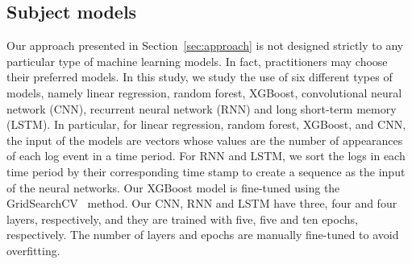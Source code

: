 \subsection{Subject models}
Our approach presented in Section~\ref{sec:approach} is not designed strictly to any particular type of machine learning models. In fact, practitioners may choose their preferred models. In this study, we study the use of six different types of models, namely linear regression, random forest, XGBoost, convolutional neural network (CNN), recurrent neural network (RNN) and long short-term memory (LSTM). In particular, for linear regression, random forest, XGBoost, and CNN, the input of the models are vectors whose values are the number of appearances of each log event in a time period. For RNN and LSTM, we sort the logs in each time period by their corresponding time stamp to create a sequence as the input of the neural networks. Our XGBoost model is fine-tuned using the GridSearchCV~\citep{girdsearcv} method. Our CNN, RNN and LSTM have three, four and four layers, respectively, and they are trained with five, five and ten epochs, respectively. The number of layers and epochs are manually fine-tuned to avoid overfitting.
 
